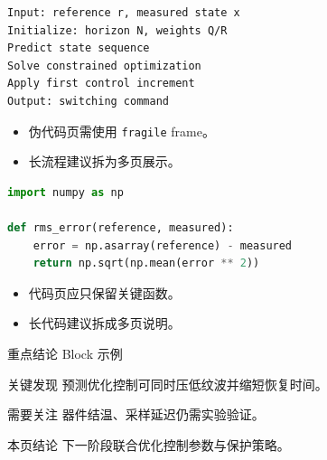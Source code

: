 \documentclass[10pt,aspectratio=169]{beamer}
\begin{document}
\begin{frame}[fragile]
\begin{HUSTContentFrame}
\begin{HUSTAlgorithmBlock}[算法伪代码示例]
\begin{lstlisting}[language={}]
Input: reference r, measured state x
Initialize: horizon N, weights Q/R
Predict state sequence
Solve constrained optimization
Apply first control increment
Output: switching command
\end{lstlisting}
\end{HUSTAlgorithmBlock}
\vspace{.06in}
\begin{itemize}
  \item 伪代码页需使用 \texttt{fragile} frame。
  \item 长流程建议拆为多页展示。
\end{itemize}
\end{HUSTContentFrame}
\end{frame}

\begin{frame}[fragile]
\begin{HUSTContentFrame}
\begin{HUSTCodeBlock}[代码片段示例]
\begin{lstlisting}[language=Python]
import numpy as np

def rms_error(reference, measured):
    error = np.asarray(reference) - measured
    return np.sqrt(np.mean(error ** 2))
\end{lstlisting}
\end{HUSTCodeBlock}
\vspace{.06in}
\begin{itemize}
  \item 代码页应只保留关键函数。
  \item 长代码建议拆成多页说明。
\end{itemize}
\end{HUSTContentFrame}
\end{frame}

\begin{frame}{重点结论 Block 示例}
\begin{HUSTContentFrame}
\begin{HUSTKeyPointBlock}{关键发现}
预测优化控制可同时压低纹波并缩短恢复时间。
\end{HUSTKeyPointBlock}
\vspace{.06in}
\begin{HUSTAlertBlock}{需要关注}
器件结温、采样延迟仍需实验验证。
\end{HUSTAlertBlock}
\vspace{.06in}
\begin{HUSTConclusionBlock}{本页结论}
下一阶段联合优化控制参数与保护策略。
\end{HUSTConclusionBlock}
\end{HUSTContentFrame}
\end{frame}
\end{document}

